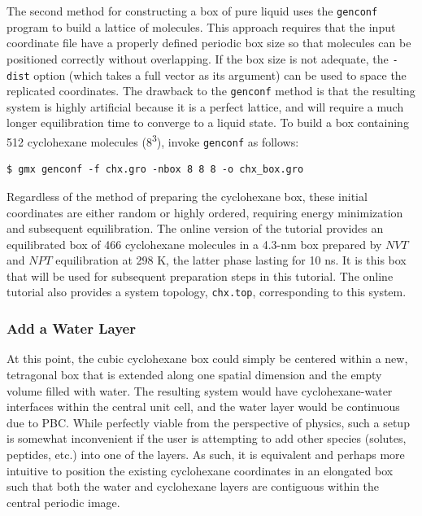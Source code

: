 \documentclass[9pt,tutorial,pubversion]{livecoms}
\begin{document}
The second method for constructing a box of pure liquid uses the \texttt{genconf} program to build a lattice of molecules. This approach requires that the input coordinate file have a properly defined periodic box size so that molecules can be positioned correctly without overlapping. If the box size is not adequate, the \texttt{-dist} option (which takes a full vector as its argument) can be used to space the replicated coordinates. The drawback to the \texttt{genconf} method is that the resulting system is highly artificial because it is a perfect lattice, and will require a much longer equilibration time to converge to a liquid state. To build a box containing 512 cyclohexane molecules (8\textsuperscript{3}), invoke \texttt{genconf} as follows:

\begin{lstlisting}
$ gmx genconf -f chx.gro -nbox 8 8 8 -o chx_box.gro
\end{lstlisting}

Regardless of the method of preparing the cyclohexane box, these initial coordinates are either random or highly ordered, requiring energy minimization and subsequent equilibration. The online version of the tutorial provides an equilibrated box of 466 cyclohexane molecules in a 4.3-nm box prepared by $NVT$ and $NPT$ equilibration at 298 K, the latter phase lasting for 10 ns. It is this box that will be used for subsequent preparation steps in this tutorial. The online tutorial also provides a system topology, \texttt{chx.top}, corresponding to this system.

\subsubsection{Add a Water Layer} \label{biphasic_water}

At this point, the cubic cyclohexane box could simply be centered within a new, tetragonal box that is extended along one spatial dimension and the empty volume filled with water. The resulting system would have cyclohexane-water interfaces within the central unit cell, and the water layer would be continuous due to PBC. While perfectly viable from the perspective of physics, such a setup is somewhat inconvenient if the user is attempting to add other species (solutes, peptides, etc.) into one of the layers. As such, it is equivalent and perhaps more intuitive to position the existing cyclohexane coordinates in an elongated box such that both the water and cyclohexane layers are contiguous within the central periodic image.
\end{document}
